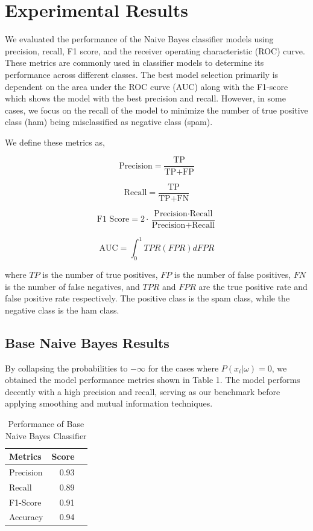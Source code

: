 \documentclass{acm_proc_article-sp}
\begin{document}
\section{Experimental Results}
We evaluated the performance of the Naive Bayes classifier models using precision, recall, F1 score, and the receiver operating characteristic (ROC) curve. These metrics are commonly used in classifier models to determine its performance across different classes. The best model selection  primarily is dependent on the area under the ROC curve (AUC) along with the F1-score which shows the model with the best precision and recall. However, in some cases, we focus on the recall of the model to minimize the number of true positive class (ham) being misclassified as negative class (spam).

We define these metrics as,

\begin{equation}
    \text{Precision} = \frac{\text{TP}}{\text{TP} + \text{FP}}
\end{equation}

\begin{equation}
    \text{Recall} = \frac{\text{TP}}{\text{TP} + \text{FN}}
\end{equation}

\begin{equation}
    \text{F1 Score} = 2 \cdot \frac{\text{Precision} \cdot \text{Recall}}{\text{Precision} + \text{Recall}}
\end{equation}

\begin{equation}
    \text{AUC} = \int_0^1 TPR(FPR) dFPR
\end{equation}

where $TP$ is the number of true positives, $FP$ is the number of false positives, $FN$ is the number of false negatives, and $TPR$ and $FPR$ are the true positive rate and false positive rate respectively. The positive class is the spam class, while the negative class is the ham class.

\subsection{Base Naive Bayes Results}
By collapsing the probabilities to $-\infty$ for the cases where $P(x_i|\omega) = 0$, we obtained the model performance metrics shown in Table 1. The model performs decently with a high precision and recall, serving as our benchmark before applying smoothing and mutual information techniques. 
\begin{table}[h]
\centering
\caption{Performance of Base Naive Bayes Classifier}
\begin{tabular}{lrr}
\toprule
Metrics & Score \\
\midrule
Precision & 0.93 \\
Recall & 0.89 \\
F1-Score & 0.91 \\
Accuracy & 0.94 \\
\bottomrule
\end{tabular}
\end{table}
\end{document}
